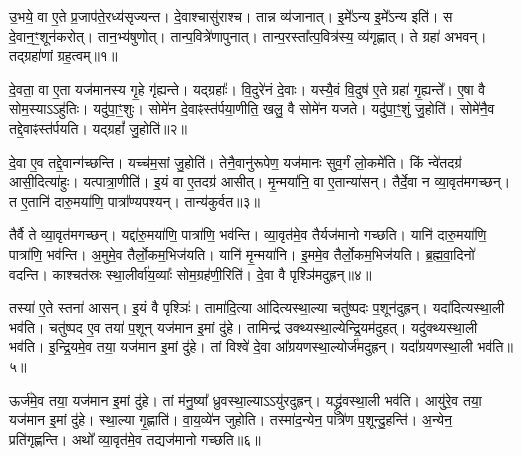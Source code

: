 \clearpage
{}
\setcounter{anuvakam}{0}

उ॒भये॒ वा ए॒ते प्र॒जा\-प॑ते॒रध्य॑सृज्यन्त।
दे॒वाश्चासु॑राश्च।
तान्न व्य॑जानात्।
इ॒मे᳚ऽन्य इ॒मे᳚ऽन्य इति॑।
स दे॒वान॒ꣳ॒शून॑करोत्।
तान॒भ्य॑षुणोत्।
तान्प॒वित्रे॑णापुनात्।
तान्प॒रस्ता᳚त्प॒वित्र॑स्य॒ व्य॑गृह्णात्।
ते ग्रहा॑ अभवन्।
तद्ग्रहा॑णां ग्रह॒त्वम्॥१॥

दे॒वता॒ वा ए॒ता यज॑मानस्य गृ॒हे गृ॑ह्यन्ते।
यद्ग्रहाः᳚।
वि॒दुरे॑नं दे॒वाः।
यस्यै॒वं वि॒दुष॑ ए॒ते ग्रहा॑ गृ॒ह्यन्ते᳚।
ए॒षा वै सोम॒स्या\-ऽऽहु॑तिः।
यदु॑पा॒ꣳ॒शुः।
सोमे॑न दे॒वाꣴस्त॑र्पया॒णीति॒ खलु॒ वै सोमे॑न यजते।
यदु॑पा॒ꣳ॒शुं जु॒होति॑।
सोमे॑नै॒व तद्दे॒वाꣴस्त॑र्पयति।
यद्ग्रहां᳚ जु॒होति॑॥२॥

दे॒वा ए॒व तद्दे॒वान्ग॑च्छन्ति।
यच्च॑म॒सां जु॒होति॑।
तेनै॒वानु॑रूपेण॒ यज॑मानः सुव॒र्गं लो॒कमे॑ति।
किं न्वे॑तदग्र॑ आसी॒दित्या॑हुः।
यत्पात्रा॒णीति॑।
इ॒यं वा ए॒तदग्र॑ आसीत्।
मृ॒न्मया॑नि॒ वा ए॒तान्या॑सन्।
तैर्दे॒वा न व्या॒वृत॑मगच्छन्।
त ए॒तानि॑ दारु॒मया॑णि॒ पात्रा᳚ण्यपश्यन्।
तान्य॑कुर्वत॥३॥

तैर्वै ते व्या॒वृत॑मगच्छन्।
यद्दा॑रु॒मया॑णि॒ पात्रा॑णि॒ भव॑न्ति।
व्या॒वृत॑मे॒व तैर्यज॑मानो गच्छति।
यानि॑ दारु॒मया॑णि॒ पात्रा॑णि॒ भव॑न्ति।
अ॒मुमे॒व तैर्लो॒कम॒भिज॑यति।
यानि॑ मृ॒न्मया॑नि।
इ॒ममे॒व तैर्लो॒कम॒भिज॑यति।
ब्र॒ह्म॒वा॒दिनो॑ वदन्ति।
काश्चत॑स्रः स्था॒लीर्वा॑य॒व्याः᳚ सोम॒ग्रह॑णी॒रिति॑।
दे॒वा वै पृश्ञि॑मदुह्रन्॥४॥

तस्या॑ ए॒ते स्तना॑ आसन्।
इ॒यं वै पृश्ञिः॑।
तामा॑दि॒त्या आ॑दित्यस्था॒ल्या चतु॑ष्पदः प॒शून॑दुह्रन्।
यदा॑दित्यस्था॒ली भव॑ति।
चतु॑ष्पद ए॒व तया॑ प॒शून् यज॑मान इ॒मां दु॑हे।
तामिन्द्र॑ उक्थ्यस्था॒ल्येन्द्रि॒यम॑दुहत्।
यदु॑क्थ्यस्था॒ली भव॑ति।
इ॒न्द्रि॒यमे॒व तया॒ यज॑मान इ॒मां दु॑हे।
तां विश्वे॑ दे॒वा आ᳚ग्रयणस्था॒ल्योर्ज॑मदुह्रन्।
यदा᳚ग्रयणस्था॒ली भव॑ति॥५॥

ऊर्ज॑मे॒व तया॒ यज॑मान इ॒मां दु॑हे।
तां म॑नु॒ष्या᳚ ध्रुवस्था॒ल्या\-ऽऽयु॑रदुह्रन्।
यद्ध्रु॑वस्था॒ली भव॑ति।
आयु॑रे॒व तया॒ यज॑मान इ॒मां दु॑हे।
स्था॒ल्या गृ॒ह्णाति॑।
वा॒य॒व्ये॑न जुहोति।
तस्मा॑द॒न्येन॒ पात्रे॑ण प॒शून्दु॒हन्ति॑।
अ॒न्येन॒ प्रति॑\-गृह्णन्ति।
अथो᳚ व्या॒वृत॑मे॒व तद्यज॑मानो गच्छति॥६॥\anuvakamend[ग्र॒ह॒त्वं ग्रहां᳚ जु॒होत्य॑कुर्वतादुह्रन्नाग्रयणस्था॒ली भव॑ति॒ नव॑ च]

